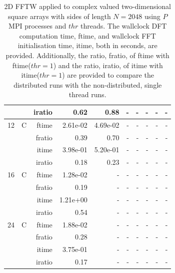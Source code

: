 \documentclass[a4paper]{article}
\begin{document}
\begin{table}[htbp]
\begin{center}
\begin{small}
\begin{tabular}{|r|r|r|r|r|r|r|r|r|r|}
          &      & iratio & 0.62 & 0.88 &     -     &     -     &     -     &     -     &     -     \\ \hline 
     12 & C & ftime & 2.61e-02 & 4.69e-02 &     -     &     -     &     -     &     -     &     -     \\   
          &      & fratio & 0.39 & 0.70 &     -     &     -     &     -     &     -     &     -     \\   
          &      & itime & 3.98e-01 & 5.20e-01 &     -     &     -     &     -     &     -     &     -     \\   
          &      & iratio & 0.18 & 0.23 &     -     &     -     &     -     &     -     &     -     \\ \hline 
     16 & C & ftime & 1.28e-02 &     -     &     -     &     -     &     -     &     -     &     -     \\   
          &      & fratio & 0.19 &     -     &     -     &     -     &     -     &     -     &     -     \\   
          &      & itime & 1.21e+00 &     -     &     -     &     -     &     -     &     -     &     -     \\   
          &      & iratio & 0.54 &     -     &     -     &     -     &     -     &     -     &     -     \\ \hline 
     24 & C & ftime & 1.88e-02 &     -     &     -     &     -     &     -     &     -     &     -     \\   
          &      & fratio & 0.28 &     -     &     -     &     -     &     -     &     -     &     -     \\   
          &      & itime & 3.75e-01 &     -     &     -     &     -     &     -     &     -     &     -     \\   
          &      & iratio & 0.17 &     -     &     -     &     -     &     -     &     -     &     -     \\ \hline 
\end{tabular}
\caption{2D FFTW applied to complex valued two-dimensional square arrays with sides of length $N=2048$ using $P$ MPI processes and $thr$ threads. The wallclock DFT computation time, ftime, and wallclock FFT initialisation time, itime, both in seconds, are provided. Additionally, the ratio, fratio, of ftime  with ftime($thr=1$) and the ratio, iratio, of itime  with itime($thr=1$) are provided to compare the distributed runs with the non-distributed, single thread runs.  }\label{TblFFTW2d2048c}
\end{small}
\end{center}
\end{table}
\end{document}
